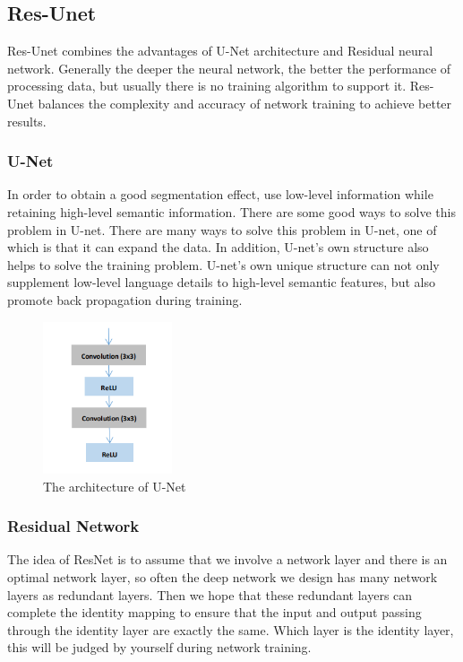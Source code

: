 \documentclass{article}
\begin{document}
\subsection{Res-Unet}
Res-Unet combines the advantages of U-Net architecture and Residual neural network.
Generally the deeper the neural network, the better the performance of processing data, but usually there is no training algorithm to support it.
Res-Unet balances the complexity and accuracy of network training to achieve better results.\cite{zhang2019zebrafish}
\subsubsection{U-Net}
In order to obtain a good segmentation effect, use low-level information while retaining high-level semantic information.
There are some good ways to solve this problem in U-net.
There are many ways to solve this problem in U-net, one of which is that it can expand the data.
In addition, U-net's own structure also helps to solve the training problem. U-net's own unique structure can not only supplement low-level language details to high-level semantic features, but also promote back propagation during training.\cite{zhang2018road}

\begin{figure}[H]
    \centering
    \includegraphics[width = 1.5in]{architecture of U-Net}
    \caption{The architecture of U-Net}
    \label{The architecture of U-Net}
\end{figure}
\subsubsection{Residual Network}
The idea of ResNet is to assume that we involve a network layer and there is an optimal network layer, so often the deep network we design has many network layers as redundant layers.
Then we hope that these redundant layers can complete the identity mapping to ensure that the input and output passing through the identity layer are exactly the same.
Which layer is the identity layer, this will be judged by yourself during network training.
\end{document}

